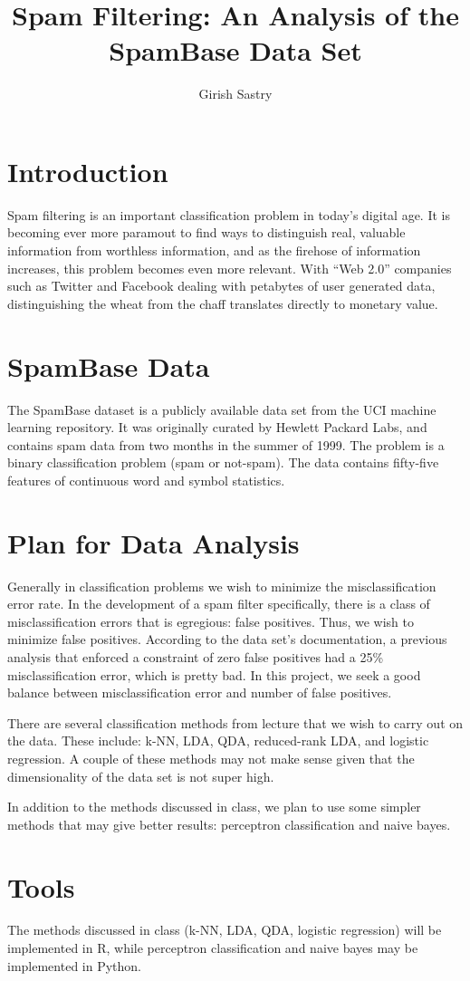 \documentclass[a4paper,10pt]{article}
\title{Spam Filtering: An Analysis of the SpamBase Data Set}
\author{Girish Sastry}
\begin{document}
\maketitle

\section{Introduction}

Spam filtering is an important classification problem in today's digital age. It is 
becoming ever more paramout to find ways to distinguish real, valuable information from
worthless information, and as the firehose of information increases, this problem becomes
even more relevant. With ``Web 2.0'' companies such as Twitter and Facebook dealing with
petabytes of user generated data, distinguishing the wheat from the chaff translates
directly to monetary value.

\section{SpamBase Data}

The SpamBase dataset is a publicly available data set from the UCI machine learning
repository. It was originally curated by Hewlett Packard Labs, and contains spam data
from two months in the summer of 1999. The problem is a binary classification problem 
(spam or not-spam). The data contains fifty-five features of continuous word and symbol 
statistics.


\section{Plan for Data Analysis}

Generally in classification problems we wish to minimize the misclassification error
rate. In the development of a spam filter specifically, there is a class of misclassification
errors that is egregious: false positives. Thus, we wish to minimize false positives. 
According to the data set's documentation, a previous analysis that enforced a constraint
of zero false positives had a 25\% misclassification error, which is pretty bad. In this
project, we seek a good balance between misclassification error and number of false positives.

There are several classification methods from lecture that we wish to carry out on the data.
These include: k-NN, LDA, QDA, reduced-rank LDA, and logistic regression. A couple of these
methods may not make sense given that the dimensionality of the data set is not super high.

In addition to the methods discussed in class, we plan to use some simpler methods that may
give better results: perceptron classification and naive bayes.

\section{Tools}

The methods discussed in class (k-NN, LDA, QDA, logistic regression) will be implemented in R,
while perceptron classification and naive bayes may be implemented in Python.
\end{document}
